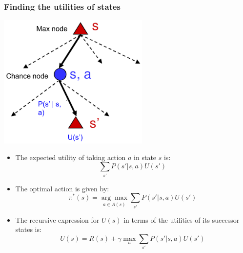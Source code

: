 \documentclass[11pt]{article}
\begin{document}
\subsubsection{Finding the utilities of states}
\label{sec:org4f6bd60}
\begin{center}
\includegraphics[height=18em]{./images/finding-the-utilities-of-state-tree.png}
\end{center}
\begin{itemize}
\item The expected utility of taking action \(a\) in state \(s\) is:
\[\sum_{s'} P (s' | s, a) U (s')\]
\item The optimal action is given by:
\[\pi^{*} (s) = \underset{a \in A(s)}{\arg \max} \sum_{s'} P (s' | s, a) U(s')\]
\item The recursive expression for \(U(s)\) in terms of the utilities of its successor states is:
\[U(s) = R(s) + \gamma \max_a \sum_{s'} P (s' | s, a) U (s')\]
\end{itemize}
\end{document}
